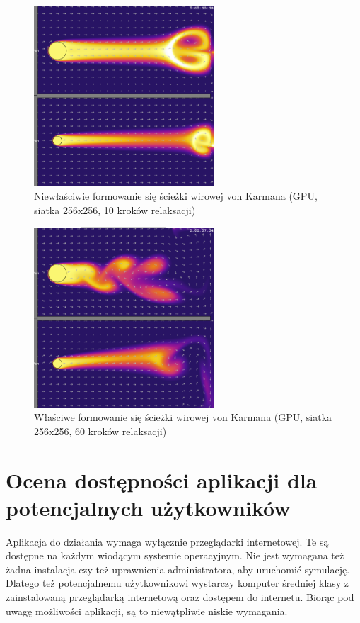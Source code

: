 \begin{figure}[!h]
\centering
\includegraphics[width=0.6\textwidth]{img/relaxGPU1}
\caption{Niewłaściwie formowanie się ścieżki wirowej von Karmana (GPU, siatka 
256x256, 10 kroków relaksacji)}
\label{fig:relaxGPU1}
\end{figure}

\begin{figure}[!h]
\centering
\includegraphics[width=0.6\textwidth]{img/relaxGPU2}
\caption{Właściwe formowanie się ścieżki wirowej von Karmana (GPU, siatka 
256x256, 60 kroków relaksacji)}
\label{fig:relaxGPU2}
\end{figure}

\clearpage

\section{Ocena dostępności aplikacji dla potencjalnych użytkowników}

Aplikacja do działania wymaga wyłącznie przeglądarki internetowej. Te są
dostępne na każdym wiodącym systemie operacyjnym. Nie jest wymagana też
żadna instalacja czy też uprawnienia administratora, aby uruchomić symulację.
Dlatego też potencjalnemu użytkownikowi wystarczy komputer średniej klasy
z zainstalowaną przeglądarką internetową oraz dostępem do internetu. Biorąc
pod uwagę możliwości aplikacji, są to niewątpliwie niskie wymagania.

